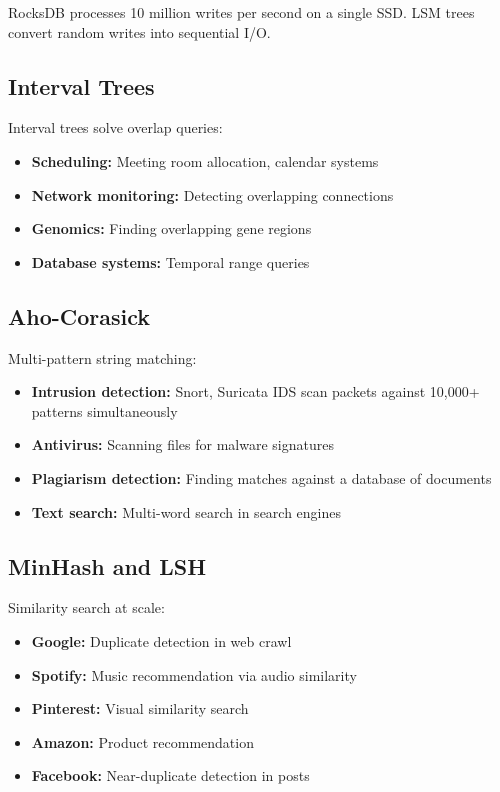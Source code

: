 RocksDB processes 10 million writes per second on a single SSD. LSM trees convert random writes into sequential I/O.

\subsection{Interval Trees}

Interval trees solve overlap queries:
\begin{itemize}
    \item \textbf{Scheduling:} Meeting room allocation, calendar systems
    \item \textbf{Network monitoring:} Detecting overlapping connections
    \item \textbf{Genomics:} Finding overlapping gene regions
    \item \textbf{Database systems:} Temporal range queries
\end{itemize}

\subsection{Aho-Corasick}

Multi-pattern string matching:
\begin{itemize}
    \item \textbf{Intrusion detection:} Snort, Suricata IDS scan packets against 10,000+ patterns simultaneously
    \item \textbf{Antivirus:} Scanning files for malware signatures
    \item \textbf{Plagiarism detection:} Finding matches against a database of documents
    \item \textbf{Text search:} Multi-word search in search engines
\end{itemize}

\subsection{MinHash and LSH}

Similarity search at scale:
\begin{itemize}
    \item \textbf{Google:} Duplicate detection in web crawl
    \item \textbf{Spotify:} Music recommendation via audio similarity
    \item \textbf{Pinterest:} Visual similarity search
    \item \textbf{Amazon:} Product recommendation
    \item \textbf{Facebook:} Near-duplicate detection in posts
\end{itemize}

